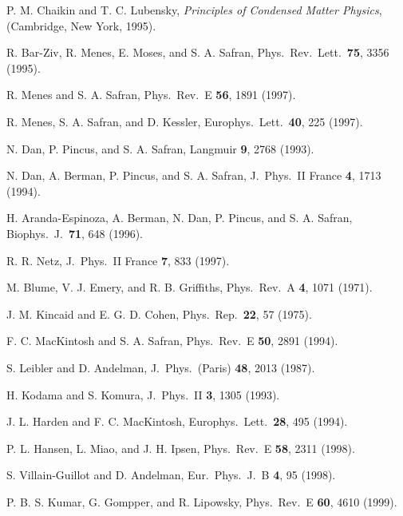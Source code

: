 \begin{references}
P. M. Chaikin and T. C. Lubensky,
{\it Principles of Condensed Matter Physics},
(Cambridge, New York, 1995).

R. Bar-Ziv, R. Menes, E. Moses, and S. A. Safran,
Phys.\ Rev.\ Lett.\ {\bf 75}, 3356 (1995).

R. Menes and S. A. Safran,
Phys.\ Rev.\ E {\bf 56}, 1891 (1997).

R. Menes, S. A. Safran, and D. Kessler,
Europhys.\ Lett.\ {\bf 40}, 225 (1997).

N. Dan, P. Pincus, and S. A. Safran,
Langmuir {\bf 9}, 2768 (1993).

N. Dan, A. Berman, P. Pincus, and S. A. Safran,
J.\ Phys.\ II France {\bf 4}, 1713 (1994).

H. Aranda-Espinoza, A. Berman, N. Dan, P. Pincus, and S. A. Safran,
Biophys.\ J.\ {\bf 71}, 648 (1996).

R. R. Netz,
J.\ Phys.\ II France {\bf 7}, 833 (1997).

M. Blume, V. J. Emery, and R. B. Griffiths,
Phys.\ Rev.\ A {\bf 4}, 1071 (1971).

J. M. Kincaid and E. G. D. Cohen,
Phys.\ Rep.\ {\bf 22}, 57 (1975).

F. C. MacKintosh and S. A. Safran,
Phys.\ Rev.\ E {\bf 50}, 2891 (1994).

S. Leibler and D. Andelman,
J.\ Phys.\ (Paris) {\bf 48}, 2013 (1987).

H. Kodama and S. Komura,
J.\ Phys.\ II {\bf 3}, 1305 (1993).

J. L. Harden and F. C. MacKintosh,
Europhys.\ Lett.\ {\bf 28}, 495 (1994).

P. L. Hansen, L. Miao, and J. H. Ipsen,
Phys.\ Rev.\ E {\bf 58}, 2311 (1998).

S. Villain-Guillot and D. Andelman,
Eur.\ Phys.\ J.\ B {\bf 4}, 95 (1998).

P. B. S. Kumar, G. Gompper, and R. Lipowsky,
Phys.\ Rev.\ E {\bf 60}, 4610 (1999).

\end{references}







